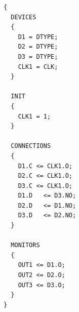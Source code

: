 \documentclass[a4paper,11pt]{article}  %
\begin{document}
\begin{lstlisting}
{
  DEVICES
  {
    D1 = DTYPE;
    D2 = DTYPE;
    D3 = DTYPE;
    CLK1 = CLK;
  }

  INIT
  {
    CLK1 = 1;
  }
  
  CONNECTIONS
  {
    D1.C <= CLK1.O;
    D2.C <= CLK1.O;
    D3.C <= CLK1.O;
    D1.D   <= D3.NO;
    D2.D   <= D1.NO;
    D3.D   <= D2.NO;
  }
  
  MONITORS
  {
    OUT1 <= D1.O;
    OUT2 <= D2.O;
    OUT3 <= D3.O;
  }
}
\end{lstlisting}
\end{document}
